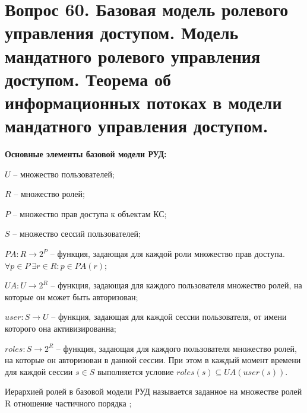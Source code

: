 \section{Вопрос 60. Базовая модель ролевого управления доступом. Модель мандатного ролевого управления доступом.
Теорема об информационных потоках в модели мандатного управления доступом.}

\textbf{Основные элементы базовой модели РУД:}
\begin{enumerate*}
	\item $U$ -- множество пользователей;
	\item $R$ -- множество ролей;
	\item $P$ -- множество прав доступа к объектам КС;
	\item $S$ -- множество сессий пользователей;
	\item $PA: R \to 2^P$ -- функция, задающая для каждой роли множество прав доступа. $\forall p \in P \ \exists r \in R : p \in PA(r)$;
	\item $UA: U \to 2^R$ -- функция, задающая для каждого пользователя множество ролей, на которые он может быть авторизован;
	\item $user: S \to U$ -- функция, задающая для каждой сессии пользователя, от имени которого она активизированна;
	\item $roles: S \to 2^R$ -- функция, задающая для каждого пользователя множество ролей, на которые он авторизован в данной сессии. При этом 
	в каждый момент времени для каждой сессии $s \in S$ выполняется условие $roles(s) \subseteq UA(user(s))$.
\end{enumerate*}

\begin{defs}[Иерархия]
	Иерархией ролей в базовой модели РУД называется заданное на множестве ролей R отношение частичного порядка \kav{$\leqslant$};
\end{defs}

